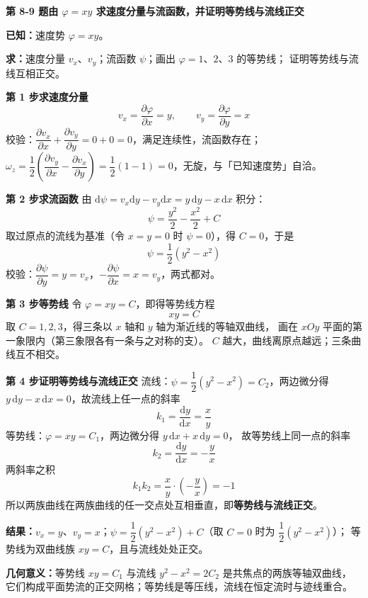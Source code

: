 \noindent\textbf{第 8-9 题\quad 由 $\varphi=xy$ 求速度分量与流函数，并证明等势线与流线正交}

\begin{jie}
\textbf{已知：}速度势 $\varphi=xy$。

\textbf{求：}速度分量 $v_x$、$v_y$；流函数 $\psi$；画出 $\varphi=1$、$2$、$3$ 的等势线；
证明等势线与流线互相正交。

\textbf{第 1 步\quad 求速度分量}
\[ v_x=\frac{\partial\varphi}{\partial x}=y,\qquad v_y=\frac{\partial\varphi}{\partial y}=x \]
校验：$\dfrac{\partial v_x}{\partial x}+\dfrac{\partial v_y}{\partial y}=0+0=0$，满足连续性，流函数存在；
$\omega_z=\dfrac{1}{2}\left(\dfrac{\partial v_y}{\partial x}-\dfrac{\partial v_x}{\partial y}\right)
=\dfrac{1}{2}(1-1)=0$，无旋，与「已知速度势」自洽。

\textbf{第 2 步\quad 求流函数}
由 $\mathrm{d}\psi=v_x\mathrm{d}y-v_y\mathrm{d}x=y\,\mathrm{d}y-x\,\mathrm{d}x$ 积分：
\[ \psi=\frac{y^2}{2}-\frac{x^2}{2}+C \]
取过原点的流线为基准（令 $x=y=0$ 时 $\psi=0$），得 $C=0$，于是
\[ \psi=\frac{1}{2}\left(y^2-x^2\right) \]
校验：$\dfrac{\partial\psi}{\partial y}=y=v_x$，$-\dfrac{\partial\psi}{\partial x}=x=v_y$，两式都对。

\textbf{第 3 步\quad 等势线}
令 $\varphi=xy=C$，即得等势线方程
\[ xy=C \]
取 $C=1,2,3$，得三条以 $x$ 轴和 $y$ 轴为渐近线的等轴双曲线，
画在 $xOy$ 平面的第一象限内（第三象限各有一条与之对称的支）。
$C$ 越大，曲线离原点越远；三条曲线互不相交。

\textbf{第 4 步\quad 证明等势线与流线正交}
流线：$\psi=\dfrac{1}{2}\left(y^2-x^2\right)=C_2$，两边微分得
$y\,\mathrm{d}y-x\,\mathrm{d}x=0$，故流线上任一点的斜率
\[ k_1=\frac{\mathrm{d}y}{\mathrm{d}x}=\frac{x}{y} \]
等势线：$\varphi=xy=C_1$，两边微分得 $y\,\mathrm{d}x+x\,\mathrm{d}y=0$，
故等势线上同一点的斜率
\[ k_2=\frac{\mathrm{d}y}{\mathrm{d}x}=-\frac{y}{x} \]
两斜率之积
\[ k_1k_2=\frac{x}{y}\cdot\left(-\frac{y}{x}\right)=-1 \]
所以两族曲线在两族曲线的任一交点处互相垂直，即\textbf{等势线与流线正交}。

\textbf{结果：}$v_x=y$、$v_y=x$；$\psi=\dfrac{1}{2}\left(y^2-x^2\right)+C$（取 $C=0$ 时为 $\dfrac{1}{2}\left(y^2-x^2\right)$）；
等势线为双曲线族 $xy=C$，且与流线处处正交。

\textbf{几何意义：}等势线 $xy=C_1$ 与流线 $y^2-x^2=2C_2$ 是共焦点的两族等轴双曲线，
它们构成平面势流的正交网格；等势线是等压线，流线在恒定流时与迹线重合。
\end{jie}

